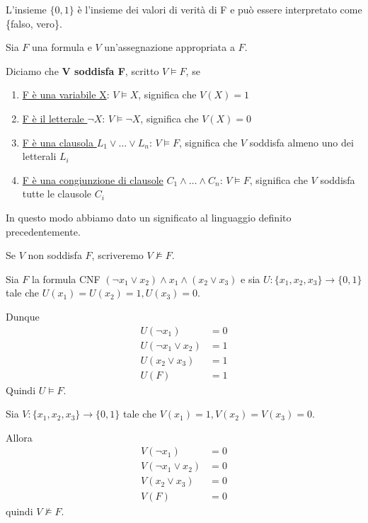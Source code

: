 \documentclass[10pt,a4paper,twoside]{book}
\begin{document}
L'insieme $\{0,1\}$ è l'insieme dei valori di verità di F e può essere interpretato come \{falso, vero\}.

\begin{definition}[Soddisfacibilità]
    Sia $F$ una formula e $V$ un'assegnazione appropriata a $F$.

    Diciamo che \textbf{V soddisfa F}, scritto $V \vDash F$, se
    \begin{enumerate}
        \item \underline{F è una variabile X}: $V \vDash X$, significa che $V(X) = 1$
        \item \underline{F è il letterale $\neg X$}: $V \vDash \neg X$, significa che $V(X) = 0$
        \item \underline{F è una clausola $L_1 \lor \ldots \lor L_n$}: $V \vDash F$, significa che $V$ soddisfa almeno uno dei letterali $L_i$
        \item \underline{F è una congiunzione di clausole} $C_1 \land \ldots \land C_n$: $V \vDash F$, significa che $V$ soddisfa tutte le clausole $C_i$
    \end{enumerate}
    In questo modo abbiamo dato un significato al linguaggio definito precedentemente.

    Se $V$ non soddisfa $F$, scriveremo $V \nvDash F$.
\end{definition}
\begin{example}
    Sia $F$ la formula CNF $(\neg x_1 \lor x_2) \land x_1 \land (x_2 \lor x_3)$ e sia $U: \{x_1,x_2,x_3\} \rightarrow \{0,1\}$ tale che $U(x_1) = U(x_2) = 1, U(x_3) = 0$.

    Dunque
    \begin{align*}
        U(\neg x_1)          & = 0 \\
        U(\neg x_1 \lor x_2) & = 1 \\
        U(x_2 \lor x_3)      & = 1 \\
        U(F)                 & = 1
    \end{align*}
    Quindi $U \vDash F$.

    Sia $V: \{x_1,x_2,x_3\} \rightarrow \{0,1\}$ tale che $V(x_1) = 1, V(x_2) = V(x_3) = 0$.

    Allora
    \begin{align*}
        V(\neg x_1)          & = 0 \\
        V(\neg x_1 \lor x_2) & = 0 \\
        V(x_2 \lor x_3)      & = 0 \\
        V(F)                 & = 0
    \end{align*}
    quindi $V \nvDash F$.
\end{example}
\end{document}
